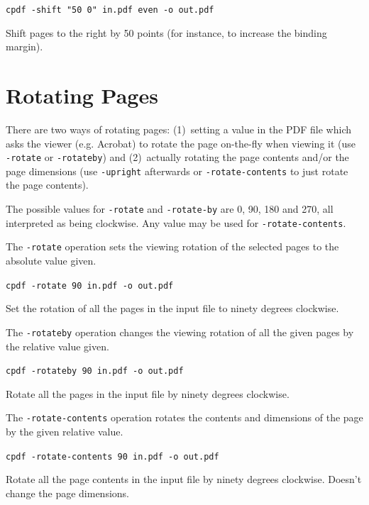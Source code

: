 \documentclass[a4paper,makeidx]{memoir}
\begin{document}
  \begin{framed}
  \small\noindent\verb!cpdf -shift "50 0" in.pdf even -o out.pdf!

  \vspace{2.5mm}

  \noindent Shift pages to the right by 50 points (for instance, to increase
the binding margin).

  \end{framed}
  \section{Rotating Pages}

There are two ways of rotating pages: (1)~setting a value in the PDF file which
asks the viewer (e.g. Acrobat) to rotate the page on-the-fly when viewing it
(use \texttt{-rotate} or \texttt{-rotateby}) and (2)~actually rotating the page
contents and/or the page dimensions (use \texttt{-upright} afterwards or
\texttt{-rotate-contents} to just rotate the page contents).

  The possible values for \texttt{-rotate} and \texttt{-rotate-by} are 0, 90,
180 and 270, all interpreted as being clockwise. Any value may be used for
\texttt{-rotate-contents}.
  
The \texttt{-rotate} operation sets the viewing rotation of the selected pages to
the absolute value given.
  \begin{framed}
  \small\verb!cpdf -rotate 90 in.pdf -o out.pdf!

  \vspace{2.5mm}
  \noindent Set the rotation of all the pages in the input file to ninety degrees clockwise.
  \end{framed}
  \noindent The \texttt{-rotateby} operation changes the viewing rotation of all the
given pages by the relative value given.
  \begin{framed}
  \small\verb!cpdf -rotateby 90 in.pdf -o out.pdf!

  \vspace{2.5mm}
  \noindent Rotate all the pages in the input file by ninety degrees clockwise.
  \end{framed}
  \noindent The \texttt{-rotate-contents} operation rotates the contents and dimensions
of the page by the given relative value.
  \begin{framed}
  \small\verb!cpdf -rotate-contents 90 in.pdf -o out.pdf!

  \vspace{2.5mm}

  \noindent Rotate all the page contents in the input file by
ninety degrees clockwise. Doesn't change the page dimensions.
  \end{framed}
\end{document}
